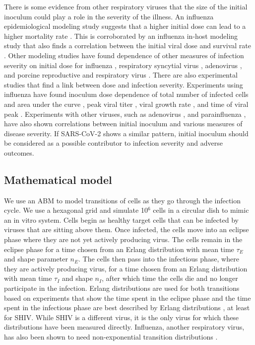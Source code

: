 There is some evidence from other respiratory viruses that the size of the initial inoculum could play a role in the severity of the illness. An influenza epidemiological modeling study suggests that a higher initial dose can lead to a higher mortality rate \citep{paulo10}. This is corroborated by an influenza in-host modeling study that also finds a correlation between the initial viral dose and survival rate \citep{price15}. Other modeling studies have found dependence of other measures of infection severity on initial dose for influenza \citep{moore20}, respiratory syncytial virus \citep{wethington19}, adenovirus \citep{li14}, and porcine reproductive and respiratory virus \citep{go19}. There are also experimental studies that find a link between dose and infection severity. Experiments using influenza have found inoculum dose dependence of total number of infected cells and area under the curve \citep{manicassamy10}, peak viral titer \citep{ginsberg52,iida63,ottolini05}, viral growth rate \citep{ginsberg52}, and time of viral peak \citep{iida63,ginsberg52}. Experiments with other viruses, such as adenovirus \citep{prince93}, and parainfluenza \citep{ottolini96}, have also shown correlations between initial inoculum and various measures of disease severity. If SARS-CoV-2 shows a similar pattern, initial inoculum should be considered as a possible contributor to infection severity and adverse outcomes.

\subsection{Mathematical model}

We use an ABM to model transitions of cells as they go through the infection cycle. We use a hexagonal grid and simulate 10$^6$ cells in a circular dish to mimic an in vitro system. Cells begin as healthy target cells that can be infected by viruses that are sitting above them. Once infected, the cells move into an eclipse phase where they are not yet actively producing virus. The cells remain in the eclipse phase for a time chosen from an Erlang distribution with mean time $\tau_E$ and shape parameter $n_E$. The cells then pass into the infectious phase, where they are actively producing virus, for a time chosen from an Erlang distribution with mean time $\tau_I$ and shape $n_I$, after which time the cells die and no longer participate in the infection. Erlang distributions are used for both transitions based on experiments that show the time spent in the eclipse phase and the time spent in the infectious phase are best described by Erlang distributions \citep{kakizoe15, beauchemin17}, at least for SHIV. While SHIV is a different virus, it is the only virus for which these distributions have been measured directly. Influenza, another respiratory virus, has also been shown to need non-exponential transition distributions \citep{holder11autoimm, holder11}. 

